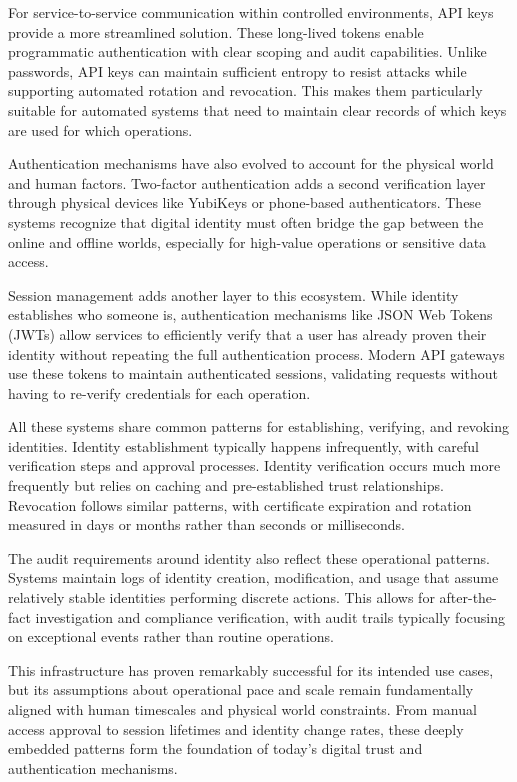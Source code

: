 \documentclass{article}
\begin{document}
For service-to-service communication within controlled environments, API keys provide a more streamlined solution. These long-lived tokens enable programmatic authentication with clear scoping and audit capabilities. Unlike passwords, API keys can maintain sufficient entropy to resist attacks while supporting automated rotation and revocation. This makes them particularly suitable for automated systems that need to maintain clear records of which keys are used for which operations.

Authentication mechanisms have also evolved to account for the physical world and human factors. Two-factor authentication adds a second verification layer through physical devices like YubiKeys or phone-based authenticators. These systems recognize that digital identity must often bridge the gap between the online and offline worlds, especially for high-value operations or sensitive data access.

Session management adds another layer to this ecosystem. While identity establishes who someone is, authentication mechanisms like JSON Web Tokens (JWTs) allow services to efficiently verify that a user has already proven their identity without repeating the full authentication process. Modern API gateways use these tokens to maintain authenticated sessions, validating requests without having to re-verify credentials for each operation.

All these systems share common patterns for establishing, verifying, and revoking identities. Identity establishment typically happens infrequently, with careful verification steps and approval processes. Identity verification occurs much more frequently but relies on caching and pre-established trust relationships. Revocation follows similar patterns, with certificate expiration and rotation measured in days or months rather than seconds or milliseconds.

The audit requirements around identity also reflect these operational patterns. Systems maintain logs of identity creation, modification, and usage that assume relatively stable identities performing discrete actions. This allows for after-the-fact investigation and compliance verification, with audit trails typically focusing on exceptional events rather than routine operations.

This infrastructure has proven remarkably successful for its intended use cases, but its assumptions about operational pace and scale remain fundamentally aligned with human timescales and physical world constraints. From manual access approval to session lifetimes and identity change rates, these deeply embedded patterns form the foundation of today's digital trust and authentication mechanisms.
\end{document}
